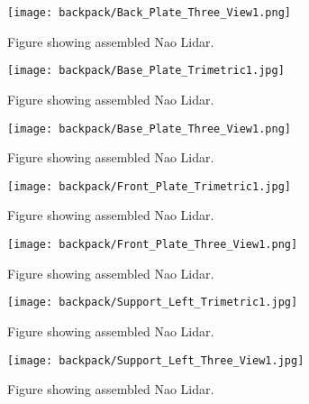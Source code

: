\begin{figure}
\centering
\texttt{[image: backpack/Back\_Plate\_Three\_View1.png]}
\caption{Figure showing assembled Nao Lidar.}
\label{fig:nao_lidar_mount_backplate_three_view1}
\end{figure}

\begin{figure}
\centering
\texttt{[image: backpack/Base\_Plate\_Trimetric1.jpg]}
\caption{Figure showing assembled Nao Lidar.}
\label{fig:nao_lidar_mount_baseplate_trimetric1}
\end{figure}

\begin{figure}
\centering
\texttt{[image: backpack/Base\_Plate\_Three\_View1.png]}
\caption{Figure showing assembled Nao Lidar.}
\label{fig:nao_lidar_mount_baseplate_three_view1}
\end{figure}

\begin{figure}
\centering
\texttt{[image: backpack/Front\_Plate\_Trimetric1.jpg]}
\caption{Figure showing assembled Nao Lidar.}
\label{fig:nao_lidar_mount_frontplate_trimetric1}
\end{figure}

\begin{figure}
\centering
\texttt{[image: backpack/Front\_Plate\_Three\_View1.png]}
\caption{Figure showing assembled Nao Lidar.}
\label{fig:nao_lidar_mount_frontplate_three_view1}
\end{figure}

\begin{figure}
\centering
\texttt{[image: backpack/Support\_Left\_Trimetric1.jpg]}
\caption{Figure showing assembled Nao Lidar.}
\label{fig:nao_lidar_mount_supportleft_trimetric1}
\end{figure}

\begin{figure}
\centering
\texttt{[image: backpack/Support\_Left\_Three\_View1.jpg]}
\caption{Figure showing assembled Nao Lidar.}
\label{fig:nao_lidar_mount_supportleft_three_view1}
\end{figure}

